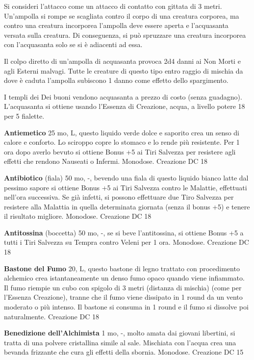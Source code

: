 \documentclass[a4paper,11pt,twoside,openany]{book}
\begin{document}
{Si consideri l'attacco come un attacco di contatto con gittata di 3 metri. Un'ampolla si rompe se scagliata contro il corpo di una creatura corporea, ma contro una creatura incorporea l'ampolla deve essere aperta e l'acquasanta versata sulla creatura. Di conseguenza, si può spruzzare una creatura incorporea con l'acquasanta solo se si è adiacenti ad essa.

Il colpo diretto di un'ampolla di acquasanta provoca 2d4 danni ai Non Morti e agli Esterni malvagi. Tutte le creature di questo tipo entro raggio di mischia da dove è caduta l'ampolla subiscono 1 danno come effetto dello spargimento.

I templi dei Dei buoni vendono acquasanta a prezzo di costo (senza guadagno). L'acquasanta si ottiene usando l'Essenza di Creazione, acqua, a livello potere 18 per 5 fialette.

\textbf{Antiemetico} 25 mo, L, questo liquido verde dolce e saporito crea un senso di calore e conforto. Lo sciroppo copre lo stomaco e lo rende più resistente. Per 1 ora dopo averlo bevuto si ottiene Bonus +5 ai Tiri Salvezza per resistere agli effetti che rendono Nauseati o Infermi. Monodose. Creazione DC 18

\textbf{Antibiotico} (fiala) 50 mo, -,  bevendo una fiala di questo liquido bianco latte dal pessimo sapore si ottiene Bonus +5 ai Tiri Salvezza contro le Malattie, effettuati nell'ora successiva. Se già infetti, si possono effettuare due Tiro Salvezza per resistere alla Malattia in quella determinata giornata (senza il bonus +5) e tenere il risultato migliore. Monodose. Creazione DC 18

\textbf{Antitossina} (boccetta) 50 mo, -, se si beve l'antitossina, si ottiene Bonus +5 a tutti i Tiri Salvezza su Tempra contro Veleni per 1 ora. Monodose. Creazione DC 18

\textbf{Bastone del Fumo} 20, L, questo bastone di legno trattato con procedimento alchemico crea istantaneamente un denso fumo opaco quando viene infiammato. Il fumo riempie un cubo con spigolo di 3 metri (distanza di mischia) (come per l'Essenza Creazione), tranne che il fumo viene dissipato in 1 round da un vento moderato o più intenso. Il bastone si consuma in 1 round e il fumo si dissolve
poi naturalmente. Creazione DC 18

\textbf{Benedizione dell'Alchimista} 1 mo, -, molto amata dai giovani libertini, si tratta di una polvere cristallina simile al sale. Mischiata con l'acqua crea una bevanda frizzante che cura gli effetti della sbornia. Monodose. Creazione DC 15

}
\end{document}
